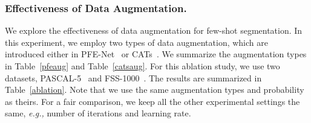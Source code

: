 \subsubsection{Effectiveness of Data Augmentation. }
We explore the effectiveness of data augmentation for few-shot segmentation. In this experiment, we employ two types of data augmentation, which are introduced either in PFE-Net~\cite{tian2020prior} or CATs~\cite{cho2021semantic}. We summarize the augmentation types in Table~\ref{pfeaug} and Table~\ref{catsaug}. For this ablation study, we use two datasets, PASCAL-5~\cite{shaban2017one} and FSS-1000~\cite{li2020fss}.  The results are summarized in Table~\ref{ablation}. Note that we use the same augmentation types and probability as theirs. For a fair comparison, we keep all the other experimental settings the same, \textit{e.g.,} number of iterations and learning rate.  

\begin{table}[]
    \centering
        \caption{\textbf{Ablation study of Data Augmentation. }}\label{ablation}
\end{table}

